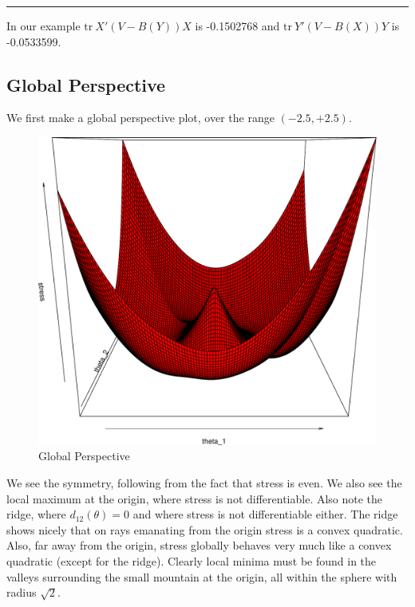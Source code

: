\documentclass[
  12pt,
  letterpaper,
  DIV=11,
  numbers=noendperiod]{scrreprt}
\theoremstyle{remark}
\begin{document}
\begin{center}\rule{0.5\linewidth}{0.5pt}\end{center}

In our example \(\text{tr}\ X'(V-B(Y))X\) is -0.1502768 and
\(\text{tr}\ Y'(V-B(X))Y\) is -0.0533599.

\subsection{Global Perspective}\label{global-perspective}

We first make a global perspective plot, over the range \((-2.5,+2.5)\).

\begin{figure}[H]

{\centering \includegraphics{spaces_files/figure-pdf/globalperspective-1.pdf}

}

\caption{Global Perspective}

\end{figure}%

We see the symmetry, following from the fact that stress is even. We
also see the local maximum at the origin, where stress is not
differentiable. Also note the ridge, where \(d_{12}(\theta)=0\) and
where stress is not differentiable either. The ridge shows nicely that
on rays emanating from the origin stress is a convex quadratic. Also,
far away from the origin, stress globally behaves very much like a
convex quadratic (except for the ridge). Clearly local minima must be
found in the valleys surrounding the small mountain at the origin, all
within the sphere with radius \(\sqrt{2}\).
\end{document}
